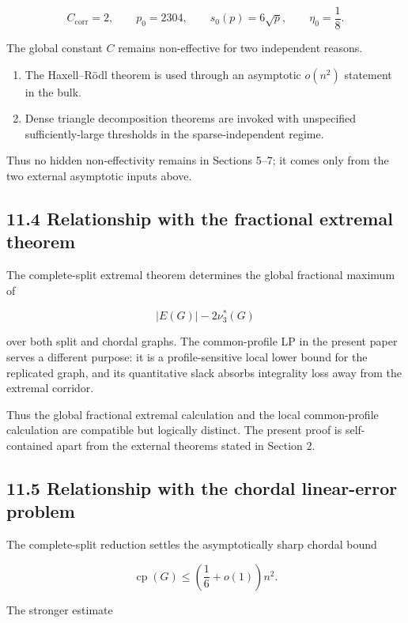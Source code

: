 \documentclass[11pt,a4paper]{article}
\providecommand{\tightlist}{\setlength{\itemsep}{0pt}\setlength{\parskip}{0pt}}
\begin{document}
\[
C_{\mathrm{corr}}=2,
\qquad
p_0=2304,
\qquad
s_0(p)=6\sqrt p,
\qquad
\eta_0=\frac18.
\]

The global constant \(C\) remains non-effective for two independent reasons.

\begin{enumerate}
\def\labelenumi{\arabic{enumi}.}
\tightlist
\item
  The Haxell--Rödl theorem is used through an asymptotic \(o(n^2)\) statement in the bulk.
\item
  Dense triangle decomposition theorems are invoked with unspecified sufficiently-large thresholds in the sparse-independent regime.
\end{enumerate}

Thus no hidden non-effectivity remains in Sections 5--7; it comes only from the two external asymptotic inputs above.

\subsection{11.4 Relationship with the fractional extremal theorem}\label{relationship-with-the-fractional-extremal-theorem}

The complete-split extremal theorem determines the global fractional maximum of

\[
|E(G)|-2\nu_3^*(G)
\]

over both split and chordal graphs. The common-profile LP in the present paper serves a different purpose: it is a profile-sensitive local lower bound for the replicated graph, and its quantitative slack absorbs integrality loss away from the extremal corridor.

Thus the global fractional extremal calculation and the local common-profile calculation are compatible but logically distinct. The present proof is self-contained apart from the external theorems stated in Section 2.

\subsection{11.5 Relationship with the chordal linear-error problem}\label{relationship-with-the-chordal-linear-error-problem}

The complete-split reduction settles the asymptotically sharp chordal bound

\[
\operatorname{cp}(G)
\le
\left(\frac16+o(1)\right)n^2.
\]

The stronger estimate
\end{document}
